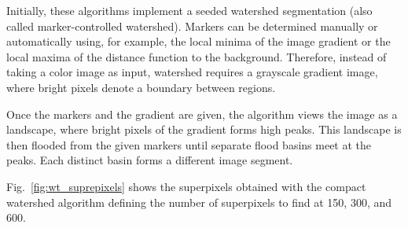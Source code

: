 Initially, these algorithms implement a seeded watershed segmentation (also called marker-controlled watershed). Markers can be determined manually or automatically using, for example, the local minima of the image gradient or the local maxima of the distance function to the background. Therefore, instead of taking a color image as input, watershed requires a grayscale gradient image, where bright pixels denote a boundary between regions.

Once the markers and the gradient are given, the algorithm views the image as a landscape, where bright pixels of the gradient forms high peaks. This landscape is then flooded from the given markers until separate flood basins meet at the peaks. Each distinct basin forms a different image segment.

Fig.\ \ref{fig:wt_suprepixels} shows the superpixels obtained with the compact watershed algorithm \citep{Neubert.Protzel:ICPR:2014} defining the number of superpixels to find at 150, 300, and 600.


